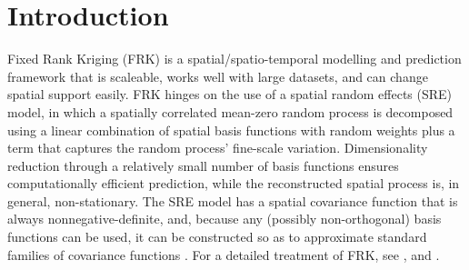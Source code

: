 \section{Introduction}\label{sec:intro}

Fixed Rank Kriging (FRK) is a spatial/spatio-temporal modelling and prediction framework that is scaleable, works well with large datasets, and can change spatial support easily. FRK hinges on the use of a spatial random effects (SRE) model, in which a spatially correlated mean-zero random process is decomposed using a linear combination of spatial basis functions with random weights plus a term that captures the random process' fine-scale variation. Dimensionality reduction through a relatively small number of basis functions ensures computationally efficient prediction, while the reconstructed spatial process is, in general, non-stationary.  The SRE model has a spatial covariance function that is always nonnegative-definite, and, because any (possibly non-orthogonal) basis functions can be used, it can be constructed so as to approximate standard families of covariance functions \citep{Kang_2011}.  For a detailed treatment of FRK, see \cite{Cressie_2006,Cressie_2008,Shi_2007}, and \cite{Nguyen_2012}.

